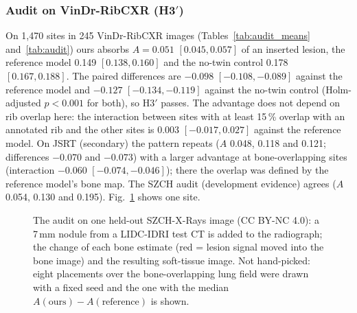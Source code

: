 \subsubsection{Audit on VinDr-RibCXR (H3$'$)}
On 1,470 sites in 245 VinDr-RibCXR images (Tables~\ref{tab:audit_means} and~\ref{tab:audit}) ours absorbs $A=0.051$ $[0.045,0.057]$ of an
inserted lesion, the reference model 0.149 $[0.138,0.160]$ and the no-twin control 0.178 $[0.167,0.188]$. The paired differences are
$-0.098$ $[-0.108,-0.089]$ against the reference model and $-0.127$ $[-0.134,-0.119]$ against the no-twin control (Holm-adjusted $p<0.001$
for both), so H3$'$ passes. The advantage does not depend on rib overlap here: the interaction between sites with at least 15\,\% overlap
with an annotated rib and the other sites is $0.003$ $[-0.017,0.027]$ against the reference model. On JSRT (secondary) the pattern repeats
($A$ 0.048, 0.118 and 0.121; differences $-0.070$ and $-0.073$) with a larger advantage at bone-overlapping sites (interaction $-0.060$
$[-0.074,-0.046]$); there the overlap was defined by the reference model's bone map. The SZCH audit (development evidence) agrees ($A$ 0.054,
0.130 and 0.195). Fig.~\ref{fig:audit_maps} shows one site.

\begin{table}[!t]
\centering
\caption{Counterfactual lesion audit on VinDr-RibCXR (1,470 sites): mean absorption of each model with image-cluster bootstrap intervals
(lower is better; ensembles of seeds 0--2). Every single seed is in Supplementary Table~S2.}
\label{tab:audit_means}
\end{table}

\begin{table}[!t]
\centering
\caption{H3$'$: paired site-level contrasts on the three audit sets, Holm over the two contrasts, and the interaction with bone overlap
($\geq$15\,\% vs.\ $<$15\,\%; top). SZCH rows use the 51 held-out images (306 sites) and remain development evidence because the audit on
all 75 images was used during development; the JSRT overlap comes from the reference model's bone map. Bottom: rib benchmark on
VinDr-RibCXR (metrics only); every method is in Supplementary Table~S3.}
\label{tab:audit}
\end{table}

\begin{figure}[!t]
\centering
{}
\caption{The audit on one held-out SZCH-X-Rays image (CC BY-NC 4.0): a 7\,mm nodule from a LIDC-IDRI test CT is added to the radiograph;
the change of each bone estimate (red = lesion signal moved into the bone image) and the resulting soft-tissue image. Not hand-picked: eight
placements over the bone-overlapping lung field were drawn with a fixed seed and the one with the median $A(\text{ours})-A(\text{reference})$
is shown.}
\label{fig:audit_maps}
\end{figure}

